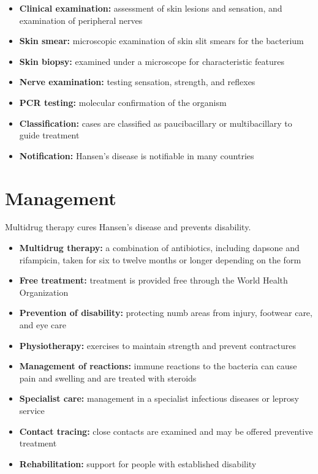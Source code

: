 \begin{itemize}
    \item \textbf{Clinical examination:} assessment of skin lesions and sensation, and examination of peripheral nerves
    \item \textbf{Skin smear:} microscopic examination of skin slit smears for the bacterium
    \item \textbf{Skin biopsy:} examined under a microscope for characteristic features
    \item \textbf{Nerve examination:} testing sensation, strength, and reflexes
    \item \textbf{PCR testing:} molecular confirmation of the organism
    \item \textbf{Classification:} cases are classified as paucibacillary or multibacillary to guide treatment
    \item \textbf{Notification:} Hansen's disease is notifiable in many countries
\end{itemize}

\section*{Management}
Multidrug therapy cures Hansen's disease and prevents disability.

\begin{itemize}
    \item \textbf{Multidrug therapy:} a combination of antibiotics, including dapsone and rifampicin, taken for six to twelve months or longer depending on the form
    \item \textbf{Free treatment:} treatment is provided free through the World Health Organization
    \item \textbf{Prevention of disability:} protecting numb areas from injury, footwear care, and eye care
    \item \textbf{Physiotherapy:} exercises to maintain strength and prevent contractures
    \item \textbf{Management of reactions:} immune reactions to the bacteria can cause pain and swelling and are treated with steroids
    \item \textbf{Specialist care:} management in a specialist infectious diseases or leprosy service
    \item \textbf{Contact tracing:} close contacts are examined and may be offered preventive treatment
    \item \textbf{Rehabilitation:} support for people with established disability
\end{itemize}

